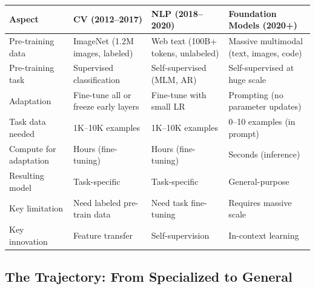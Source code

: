 \documentclass{article}
\begin{document}
\begin{center}
\begin{tabular}{p{3cm}p{3.5cm}p{3.5cm}p{3.5cm}}
\toprule
\textbf{Aspect} & \textbf{CV (2012--2017)} & \textbf{NLP (2018--2020)} & \textbf{Foundation Models (2020+)} \\
\midrule
Pre-training data & ImageNet (1.2M images, labeled) & Web text (100B+ tokens, unlabeled) & Massive multimodal (text, images, code) \\
\midrule
Pre-training task & Supervised classification & Self-supervised (MLM, AR) & Self-supervised at huge scale \\
\midrule
Adaptation & Fine-tune all or freeze early layers & Fine-tune with small LR & Prompting (no parameter updates) \\
\midrule
Task data needed & 1K--10K examples & 1K--10K examples & 0--10 examples (in prompt) \\
\midrule
Compute for adaptation & Hours (fine-tuning) & Hours (fine-tuning) & Seconds (inference) \\
\midrule
Resulting model & Task-specific & Task-specific & General-purpose \\
\midrule
Key limitation & Need labeled pre-train data & Need task fine-tuning & Requires massive scale \\
\midrule
Key innovation & Feature transfer & Self-supervision & In-context learning \\
\bottomrule
\end{tabular}
\end{center}

\subsection{The Trajectory: From Specialized to General}
\end{document}
